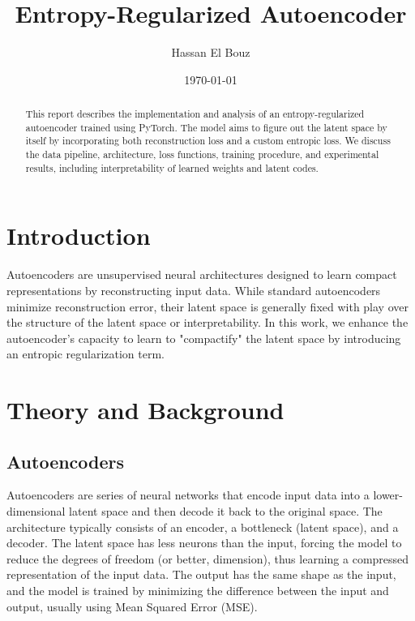 \documentclass[12pt]{article}
\title{Entropy-Regularized Autoencoder}
\author{Hassan El Bouz}
\date{\today}
\begin{document}
\maketitle

\begin{abstract}
This report describes the implementation and analysis of an entropy-regularized autoencoder trained using PyTorch. The model aims to figure out the latent space by itself by incorporating both reconstruction loss and a custom entropic loss. We discuss the data pipeline, architecture, loss functions, training procedure, and experimental results, including interpretability of learned weights and latent codes.
\end{abstract}

\section{Introduction}
Autoencoders are unsupervised neural architectures designed to learn compact representations by reconstructing input data. While standard autoencoders minimize reconstruction error, their latent space is generally fixed with play over the structure of the latent space or interpretability. In this work, we enhance the autoencoder's capacity to learn to "compactify" the latent space by introducing an entropic regularization term.

\section{Theory and Background}
\subsection{Autoencoders}
Autoencoders are series of neural networks that encode input data into a lower-dimensional latent space and then decode it back to the original space. The architecture typically consists of an encoder, a bottleneck (latent space), and a decoder. The latent space has less neurons than the input, forcing the model to reduce the degrees of freedom (or better, dimension), thus learning a compressed representation of the input data. The output has the same shape as the input, and the model is trained by minimizing the difference between the input and output, usually using Mean Squared Error (MSE).
\end{document}
